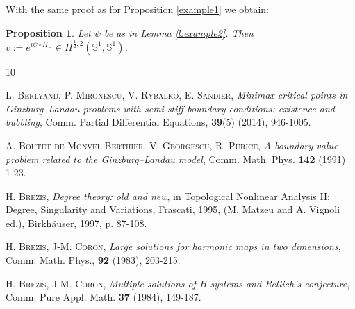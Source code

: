 \documentclass[12pt, a4paper]{article}
\newtheorem{prop}[thm]{Proposition}
\newcommand{\sph}{\mathbb{S}}
\renewcommand{\(}{\left(}
\renewcommand{\)}{\right)}
\begin{document}
With the same proof as for Proposition \ref{example1} we obtain:

\begin{prop}\label{example2} Let $\psi$ be as in Lemma \ref{l:example2}. Then $v:=e^{i\psi\circ\Pi_-}\in H^{\frac12,2}(\sph^1,\sph^1)$.
\end{prop}



\begin{thebibliography}{10}
\small

 \textsc{L. Berlyand, P. Mironescu, V. Rybalko, E. Sandier}, \emph{Minimax critical points in Ginzburg–Landau problems with semi-stiff boundary conditions: existence and bubbling}, Comm. Partial Differential Equations, \textbf{39}(5) (2014), 946-1005.



 \textsc{A. Boutet de Monvel-Berthier, V. Georgescu, R. Purice}, \emph{A boundary value problem related to the Ginzburg–Landau model}, Comm. Math. Phys. \textbf{142} (1991) 1-23.

 \textsc{H. Brezis}, \emph{Degree theory: old and new}, in Topological Nonlinear Analysis II: Degree, Singularity and Variations, Frascati, 1995, (M. Matzeu and A. Vignoli ed.), Birkh\"auser, 1997, p. 87-108.

 \textsc{H. Brezis, J-M. Coron,} \emph{Large solutions for harmonic maps in two dimensions},  Comm. Math. Phys., \textbf{92} (1983), 203-215.

 \textsc{H. Brezis, J-M. Coron,} \emph{Multiple solutions of H-systems and Rellich's conjecture},  Comm. Pure Appl. Math. \textbf{37} (1984), 149-187.



\end{thebibliography}
\end{document}
